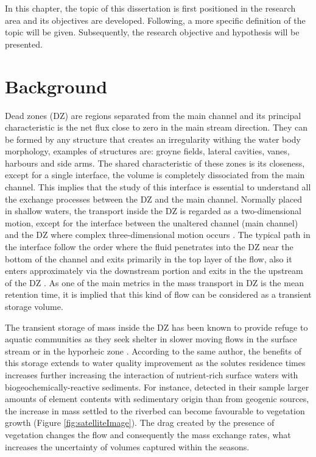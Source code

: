 \documentclass[../main.tex]{subfiles}
\begin{document}
In this chapter, the topic of this dissertation is first positioned in the research area and its objectives are developed. Following, a more specific definition of the topic will be given. Subsequently, the research objective and hypothesis will be presented.
\section{Background}
Dead zones (DZ) are regions separated from the main channel and its principal characteristic is the net flux close to zero in the main stream direction. They can be formed by any structure that creates an irregularity withing the water body morphology, examples of structures are: groyne fields, lateral cavities, vanes, harbours and side arms. The shared characteristic of these zones is its closeness, except for a single interface, the volume is completely dissociated from the main channel. This implies that the study of this interface is essential to understand all the exchange processes between the DZ and the main channel. Normally placed in shallow waters, the transport inside the DZ is regarded as a two-dimensional motion, except for the interface between the unaltered channel (main channel) and the DZ where complex three-dimensional motion occurs \cite{xiang2020}. The typical path in the interface follow the order where the fluid penetrates into the DZ near the bottom of the channel and exits primarily in the top layer of the flow, also it enters approximately via the downstream portion and exits in the the upstream of the DZ \cite{weitbrecht2004,xiang2020}. As one of the main metrics in the mass transport in DZ is the mean retention time, it is implied that this kind of flow can be considered as a transient storage volume.

The transient storage of mass inside the DZ has been known to provide refuge to aquatic communities as they seek shelter in slower moving flows in the surface stream or in the hyporheic zone \cite{jackson2013}. According to the same author, the benefits of this storage extends to water quality improvement as the solutes residence times increases further increasing the  interaction of nutrient-rich surface waters with biogeochemically-reactive sediments. For instance, \textcite{SchwartzKozerski2003} detected in their sample larger amounts of element contents with sedimentary origin than from geogenic sources, the increase in mass settled to the riverbed can become favourable to vegetation growth (Figure \ref{fig:satelliteImage}). The drag created by the presence of vegetation changes the flow and consequently the mass exchange rates, what increases the uncertainty of volumes captured within the seasons.
\end{document}
